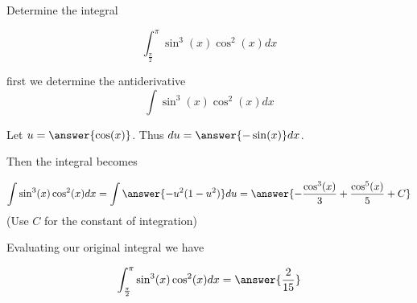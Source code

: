 \documentclass{ximera}
\author{Jason Miller}
\begin{document}
\begin{exercise}
Determine the integral

\[
\int_{\frac{\pi}{2}}^{\pi} \sin^{3}(x)\cos^{2}(x) dx
\]

first we determine the antiderivative
\[
\int \sin^{3}(x)\cos^{2}(x) dx
\]

Let $u=\answer{ \cos(x)}$. Thus $du = \answer{ -\sin(x)} dx$.

\begin{exercise}
Then the integral becomes

\[ 
\int \sin^{3}(x) \cos^{2}(x) dx= \int \answer{- u^{2}(1-u^{2}) } du= \answer{ -\frac{ \cos^{3}(x)}{3} + \frac{ \cos^{5}(x)}{5} +C  }
\]
(Use $C$ for the constant of integration)

\begin{exercise}
Evaluating our original integral we have

\[
\int_{\frac{ \pi}{2}}^{\pi} \sin^{3}(x) \cos^{2}(x) dx= \answer { \frac{2}{15} }
\]



\end{exercise}
\end{exercise}
\end{exercise}
\end{document}
